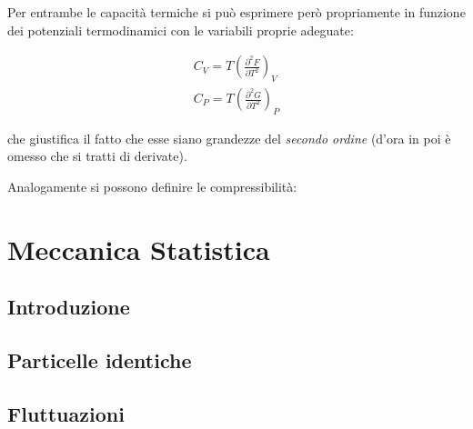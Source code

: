 Per entrambe le capacità termiche si può esprimere però propriamente in funzione dei potenziali termodinamici con le variabili proprie adeguate:

\begin{align*}
C_V = T \left(\frac{\partial^2 F}{\partial T^2}\right)_V\\
C_P = T \left(\frac{\partial^2 G}{\partial T^2}\right)_P
\end{align*}

\noindent che giustifica il fatto che esse siano grandezze del \textit{secondo ordine} (d'ora in poi è omesso che si tratti di derivate).
\newline

Analogamente si possono definire le compressibilità:


\section{Meccanica Statistica}
\label{sec:statmech}

\subsection{Introduzione}
\label{sec:stmechintro}

\subsection{Particelle identiche}
\label{sec:idpart}

\subsection{Fluttuazioni}
\label{sec:fluct}